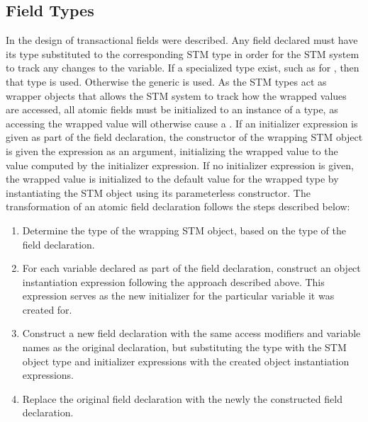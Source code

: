 \subsection{Field Types}\label{subsec:extension_field}
In  the design of transactional fields were described. Any field declared  must have its type substituted to the corresponding \ac{STM} type in order for the \ac{STM} system to track any changes to the variable. If a specialized type exist, such as  for , then that type is used. Otherwise the generic  is used.  As the \ac{STM} types act as wrapper objects that allows the \ac{STM} system to track how the wrapped values are accessed, all atomic fields must be initialized to an instance of a  type, as accessing the wrapped value will otherwise cause a . If an initializer expression is given as part of the field declaration, the constructor of the wrapping \ac{STM} object is given the expression as an argument, initializing the wrapped value to the value computed by the initializer expression. If no initializer expression is given, the wrapped value is initialized to the default value for the wrapped type by instantiating the \ac{STM} object using its parameterless constructor. The transformation of an atomic field declaration follows the steps described below:

\begin{enumerate}
	\item Determine the type of the wrapping \ac{STM} object, based on the type of the field declaration.
	\item For each variable declared as part of the field declaration, construct an object instantiation expression following the approach described above. This expression serves as the new initializer for the particular variable it was created for.
	\item Construct a new field declaration with the same access modifiers and variable names as the original declaration, but substituting the type with the \ac{STM} object type and initializer expressions with the created object instantiation expressions.
	\item Replace the original field declaration with the newly the constructed field declaration. 
\end{enumerate}

